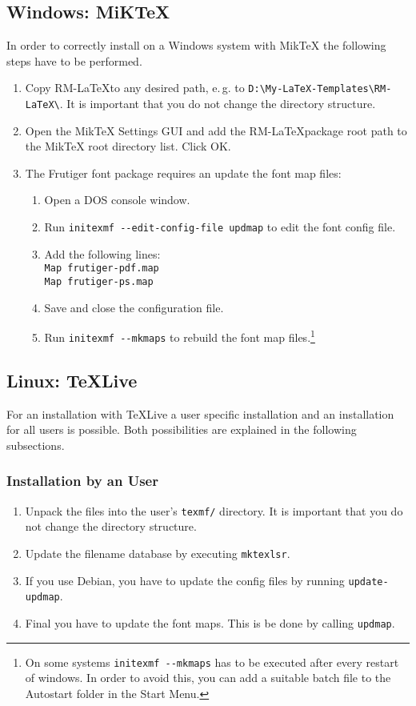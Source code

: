 \documentclass{scrartcl}
\begin{document}
\subsection{Windows: MiKTeX}
In order to correctly install \rmlatex on a Windows system with MikTeX the following steps have to be performed. 
\begin{enumerate}
	\item Copy RM-\LaTeX to any desired path, e.\,g. to \texttt{D:\textbackslash My-LaTeX-Templates\textbackslash RM-LaTeX\textbackslash}. It is important that you do not change the directory structure.
	\item Open the MikTeX Settings GUI and add the RM-\LaTeX package root path to the MikTeX root directory list. Click OK.
	\item The Frutiger font package requires an update the font map files:
		\begin{enumerate}
			\item Open a DOS console window.
			\item Run \texttt{initexmf -{}-edit-config-file updmap} to edit the font config file.
			\item Add the following lines:\\
						\texttt{Map frutiger-pdf.map} \\
						\texttt{Map frutiger-ps.map}
			\item Save and close the configuration file.
			\item Run \texttt{initexmf -{}-mkmaps} to rebuild the font map files.\footnote{On some systems \texttt{initexmf -{}-mkmaps} has to be executed after every restart of windows. In order to avoid this, you can add a suitable batch file to the Autostart folder in the Start Menu.} 
		\end{enumerate}
\end{enumerate}

%
\subsection{Linux: TeXLive}
For an installation with TeXLive a user specific installation and an installation for all users is possible. Both possibilities are explained in the following subsections.

%
%
\subsubsection{Installation by an User}
\begin{enumerate}		
	\item Unpack the files into the user's \texttt{texmf/} directory. It is important that you do not change the directory structure.
	\item Update the filename database by executing \texttt{mktexlsr}.
	\item If you use Debian, you have to update the config files by running \texttt{update-updmap}.
	\item Final you have to update the font maps. This is be done by calling \texttt{updmap}.
\end{enumerate}
\end{document}
